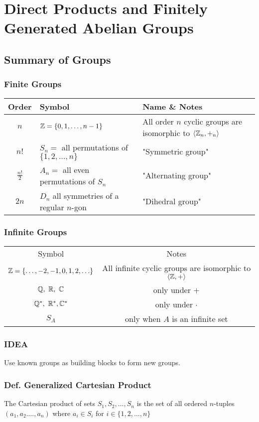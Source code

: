 \section{Direct Products and Finitely Generated Abelian Groups}

\subsection{Summary of Groups}

\subsubsection*{Finite Groups}

\begin{tabular}[center]{cll}
    Order & Symbol & Name \& Notes \\
    \hline
    $n$ & $\mathbb{Z} = \{0,1,\ldots,n-1\}$ & All order $n$ cyclic groups are isomorphic to $\langle \mathbb{Z}_n, +_n \rangle$ \\
    $n!$ & $S_n =$ all permutations of $\{1,2,\ldots,n\}$ & "Symmetric group" \\
    $\frac{n!}{2}$ & $A_n =$ all even permutations of $S_n$ & "Alternating group" \\
    $2n$ & $D_n$ all symmetries of a regular $n$-gon & "Dihedral group"
\end{tabular}

\subsubsection*{Infinite Groups}

\begin{tabular}[center]{cc}
    Symbol & Notes \\
    $\mathbb{Z} = \{\ldots,-2,-1,0,1,2,\ldots\}$ & All infinite cyclic groups are isomorphic to $\langle \mathbb{Z},+ \rangle$ \\
    $\mathbb{Q},~\mathbb{R},~\mathbb{C}$ & only under $+$ \\
    $\mathbb{Q}^*,~\mathbb{R}^*,\mathbb{C}^*$ & only under $\cdot$ \\
    $S_A$ & only when $A$ is an infinite set
\end{tabular}

\subsubsection*{IDEA}
Use known groups as building blocks to form new groups.

\subsubsection{Def. Generalized Cartesian Product}
The Cartesian product of sets $S_1,S_2,\ldots,S_n$ is the set of all ordered $n$-tuples $(a_1,a_2.\ldots,a_n)$ where $a_i \in S_i$ for $i \in \{1,2,\ldots,n\}$

